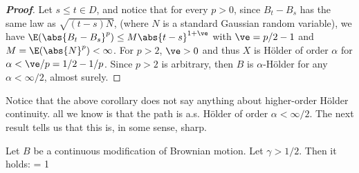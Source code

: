 \begin{proof}[\bf Proof]
Let $s \leq t \in D$, and notice that for every $p > 0$, since $B_t - B_s$ has the same law as $\sqrt{(t - s)N}$, (where $N$ is a standard Gaussian random variable), we have $\E(\abs{B_t - B_s}^p) \leq M\abs{t-s}^{1+\ve}$ with $\ve = p/2-1$ and $M = \E(\abs{N}^p) < \infty$. For $p > 2$, $\ve > 0$ and thus $X$ is H\"older of order $\alpha$ for $\alpha < \ve/p = 1/2 - 1/p$. Since $p > 2$ is arbitrary, then $B$ is $\alpha$-H\"older for any $\alpha < \infty/2$, almost surely.
\end{proof}

Notice that the above corollary does not say anything about higher-order H\"older continuity. all we know is that the path is a.s. H\"older of order $\alpha < \infty/2$. The next result tells us that this is, in some sense, sharp.

\begin{theorem}
Let $B$ be a continuous modification of Brownian motion. Let $\gamma > 1/2$. Then it holds:
\be
\pro{} = 1
\ee
\end{theorem}

